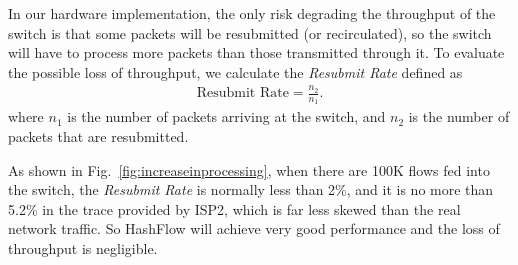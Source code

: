 In our hardware implementation, the only risk degrading the throughput of the switch is that some packets will be resubmitted (or recirculated), so the switch will have to process more packets than those transmitted through it. To evaluate the possible loss of throughput, we calculate the \emph{Resubmit Rate} defined as 
\begin{eqnarray*}
\text{Resubmit Rate}=\frac{n_2}{n_1}.
\end{eqnarray*}
where $n_1$ is the number of packets arriving at the switch, and $n_2$ is the number of packets that are resubmitted.

As shown in Fig.~\ref{fig:increaseinprocessing}, when there are 100K flows fed into the switch, the \emph{Resubmit Rate} is normally less than 2\%, and it is no more than 5.2\% in the trace provided by ISP2, which is far less skewed than the real network traffic. So HashFlow will achieve very good performance and the loss of throughput is negligible.




